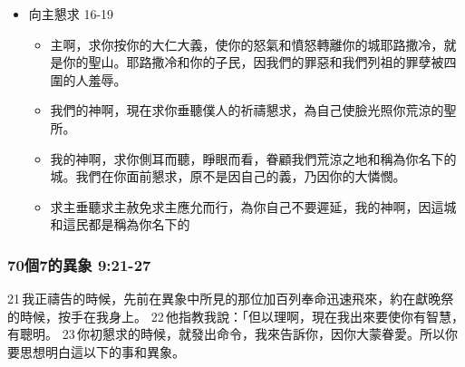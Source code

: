 \begin{itemize}
\begin{itemize}
\begin{itemize}
\itemsep-.45em  
\item 主使得你僕人摩西律法上所寫的咒詛和誓言都傾在我們身上，因我們得罪了神。 
\item 他使大災禍臨到我們，成就了警戒我們和審判我們官長的話。
\item 原來在普天之下，未曾行過像在耶路撒冷所行的。 
\item 這一切災禍臨到我們身上，是照摩西律法上所寫的，我們卻沒有求耶和華我們神的恩典，使我們回頭離開罪孽，明白你的真理。
\item 所以耶和華留意使這災禍臨到我們身上，因為耶和華我們的神在他所行的事上都是公義，我們並沒有聽從他的話
\item 主我們的神啊你曾用大能的手領你的子民出埃及地，使自己得了名，如今日一樣。我們犯罪作了惡
\end{itemize}
\item 向主懇求 16-19
\begin{itemize}
\itemsep-.45em  
\item 主啊，求你按你的大仁大義，使你的怒氣和憤怒轉離你的城耶路撒冷，就是你的聖山。耶路撒冷和你的子民，因我們的罪惡和我們列祖的罪孽被四圍的人羞辱。 
\item 我們的神啊，現在求你垂聽僕人的祈禱懇求，為自己使臉光照你荒涼的聖所。 
\item 我的神啊，求你側耳而聽，睜眼而看，眷顧我們荒涼之地和稱為你名下的城。我們在你面前懇求，原不是因自己的義，乃因你的大憐憫。 
\item 求主垂聽求主赦免求主應允而行，為你自己不要遲延，我的神啊，因這城和這民都是稱為你名下的 
\end{itemize}
\end{itemize}
\end{itemize}



\subsubsection{70個7的異象 9:21-27}
21 我正禱告的時候，先前在異象中所見的那位加百列奉命迅速飛來，約在獻晚祭的時候，按手在我身上。 22 他指教我說：「但以理啊，現在我出來要使你有智慧，有聰明。 23 你初懇求的時候，就發出命令，我來告訴你，因你大蒙眷愛。所以你要思想明白這以下的事和異象。

